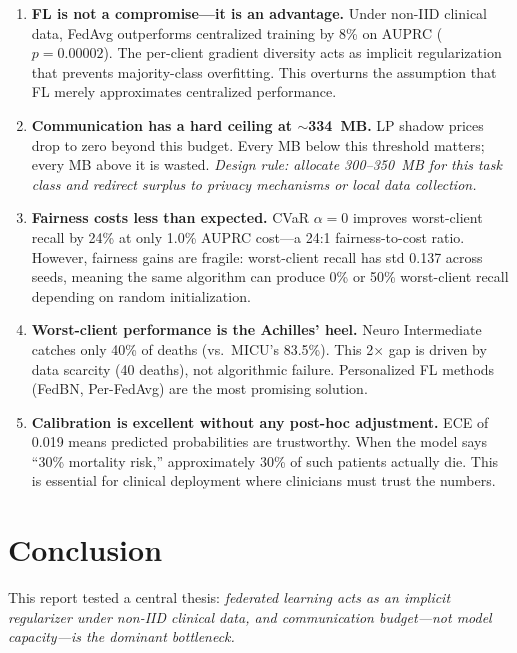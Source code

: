 \documentclass[11pt,a4paper]{report}
\begin{document}
\begin{enumerate}[leftmargin=2em]
\item \textbf{FL is not a compromise---it is an advantage.} Under non-IID clinical data, FedAvg outperforms centralized training by 8\% on AUPRC ($p = 0.00002$). The per-client gradient diversity acts as implicit regularization that prevents majority-class overfitting. This overturns the assumption that FL merely approximates centralized performance.

\item \textbf{Communication has a hard ceiling at $\sim$334~MB.} LP shadow prices drop to zero beyond this budget. Every MB below this threshold matters; every MB above it is wasted. \emph{Design rule: allocate 300--350~MB for this task class and redirect surplus to privacy mechanisms or local data collection.}

\item \textbf{Fairness costs less than expected.} CVaR $\alpha=0$ improves worst-client recall by 24\% at only 1.0\% AUPRC cost---a 24:1 fairness-to-cost ratio. However, fairness gains are fragile: worst-client recall has std 0.137 across seeds, meaning the same algorithm can produce 0\% or 50\% worst-client recall depending on random initialization.

\item \textbf{Worst-client performance is the Achilles' heel.} Neuro Intermediate catches only 40\% of deaths (vs.\ MICU's 83.5\%). This 2$\times$ gap is driven by data scarcity (40 deaths), not algorithmic failure. Personalized FL methods (FedBN, Per-FedAvg) are the most promising solution.

\item \textbf{Calibration is excellent without any post-hoc adjustment.} ECE of 0.019 means predicted probabilities are trustworthy. When the model says ``30\% mortality risk,'' approximately 30\% of such patients actually die. This is essential for clinical deployment where clinicians must trust the numbers.
\end{enumerate}


\chapter{Conclusion}

This report tested a central thesis: \emph{federated learning acts as an implicit regularizer under non-IID clinical data, and communication budget---not model capacity---is the dominant bottleneck.}
\end{document}
